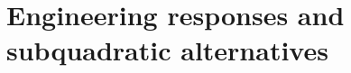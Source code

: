 \setcounter{tocdepth}{1}
\chapter{Engineering responses and subquadratic alternatives}
\label{ch:engineering-alternatives}






\setcounter{tocdepth}{2}
